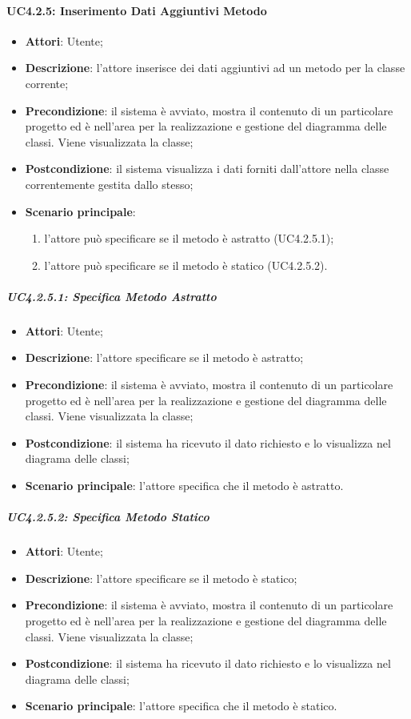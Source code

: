 \paragraph{UC4.2.5: Inserimento Dati Aggiuntivi Metodo}
\label{UC4.2.5}
\begin{itemize}
	\item \textbf{Attori}: Utente;
	\item \textbf{Descrizione}: l'attore inserisce dei dati aggiuntivi ad un metodo per la classe corrente;
	\item \textbf{Precondizione}:  il sistema è avviato, mostra il contenuto di un particolare progetto ed è nell'area per la realizzazione e gestione del diagramma delle classi. Viene visualizzata la classe;
	\item \textbf{Postcondizione}: il sistema visualizza i dati forniti dall'attore nella classe correntemente gestita dallo stesso;
	\item \textbf{Scenario principale}:
	\begin{enumerate}
		\item l'attore può specificare se il metodo è astratto (UC4.2.5.1);
		\item l'attore può specificare se il metodo è statico (UC4.2.5.2).
	\end{enumerate}
\end{itemize}

\subparagraph{UC4.2.5.1: Specifica Metodo Astratto}
\label{UC4.2.5.1}
\begin{itemize}
	\item \textbf{Attori}: Utente;
	\item \textbf{Descrizione}: l'attore specificare se il metodo è astratto;
	\item \textbf{Precondizione}: il sistema è avviato, mostra il contenuto di un particolare progetto ed è nell'area per la realizzazione e gestione del diagramma delle classi. Viene visualizzata la classe;
	\item \textbf{Postcondizione}: il sistema ha ricevuto il dato richiesto e lo visualizza nel diagrama delle classi;
	\item \textbf{Scenario principale}: l'attore specifica che il metodo è astratto.
\end{itemize}

\subparagraph{UC4.2.5.2: Specifica Metodo Statico}
\label{UC4.2.5.2}
\begin{itemize}
	\item \textbf{Attori}: Utente;
	\item \textbf{Descrizione}: l'attore specificare se il metodo è statico;
	\item \textbf{Precondizione}: il sistema è avviato, mostra il contenuto di un particolare progetto ed è nell'area per la realizzazione e gestione del diagramma delle classi. Viene visualizzata la classe;
	\item \textbf{Postcondizione}: il sistema ha ricevuto il dato richiesto e lo visualizza nel diagrama delle classi;
	\item \textbf{Scenario principale}: l'attore specifica che il metodo è statico.
\end{itemize}

